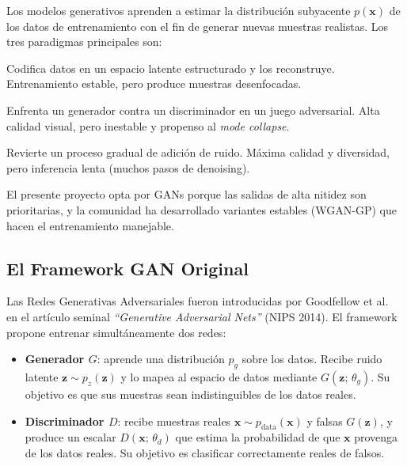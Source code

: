\documentclass[a4paper,11pt]{article}
\begin{document}
Los modelos generativos aprenden a estimar la distribución subyacente $p(\bm{x})$
de los datos de entrenamiento con el fin de generar nuevas muestras realistas.
Los tres paradigmas principales son:

\begin{description}[leftmargin=!, labelwidth=2.5cm]
    \item[\textbf{VAE}] Codifica datos en un espacio latente estructurado y los
          reconstruye. Entrenamiento estable, pero produce muestras desenfocadas.
    \item[\textbf{GAN}] Enfrenta un generador contra un discriminador en un juego
          adversarial. Alta calidad visual, pero inestable y propenso al
          \textit{mode collapse}.
    \item[\textbf{Diffusion}] Revierte un proceso gradual de adición de ruido.
          Máxima calidad y diversidad, pero inferencia lenta (muchos pasos de
          denoising).
\end{description}

El presente proyecto opta por GANs porque las salidas de alta nitidez son
prioritarias, y la comunidad ha desarrollado variantes estables (WGAN-GP)
que hacen el entrenamiento manejable.

\subsection{El Framework GAN Original}
\label{sec:gan_original}

Las Redes Generativas Adversariales fueron introducidas por
Goodfellow et al.~\cite{goodfellow2014} en el artículo seminal
\textit{``Generative Adversarial Nets''} (NIPS 2014). El framework propone
entrenar simultáneamente dos redes:

\begin{itemize}
    \item \textbf{Generador $G$}: aprende una distribución $p_g$ sobre los datos.
          Recibe ruido latente $\bm{z} \sim p_z(\bm{z})$ y lo mapea al espacio
          de datos mediante $G(\bm{z};\,\theta_g)$. Su objetivo es que sus
          muestras sean indistinguibles de los datos reales.
    \item \textbf{Discriminador $D$}: recibe muestras reales
          $\bm{x} \sim p_{\text{data}}(\bm{x})$ y falsas $G(\bm{z})$, y produce
          un escalar $D(\bm{x};\,\theta_d)$ que estima la probabilidad de que
          $\bm{x}$ provenga de los datos reales. Su objetivo es clasificar
          correctamente reales de falsos.
\end{itemize}
\end{document}
